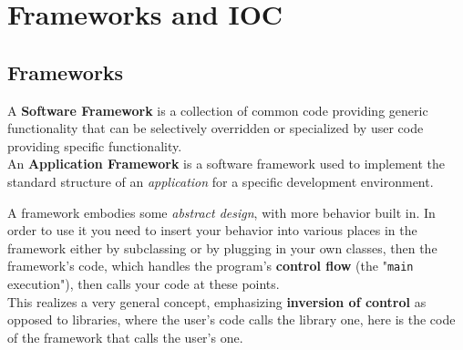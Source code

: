 \chapter{Frameworks and IOC}
\section{Frameworks}

A \textbf{Software Framework}
is a collection of common code
providing generic functionality that can be selectively
overridden or specialized by user code providing
specific functionality.\\
An \textbf{Application Framework} is a software framework used to
implement the standard structure of an \textit{application} for
a specific development environment.


A framework embodies some \textit{abstract design}, with
more behavior built in.
In order to use it you need to insert your behavior into various places in the framework either by subclassing or by plugging in your own classes,
then 
the framework’s code, which handles the program's \textbf{control flow} (the "\texttt{main} execution"), then calls your code at these points.\\
This realizes a very general concept, emphasizing \textbf{inversion of
control} as opposed to libraries,
where the user's code calls the library one,
here is the code of the framework that calls the user's one.

